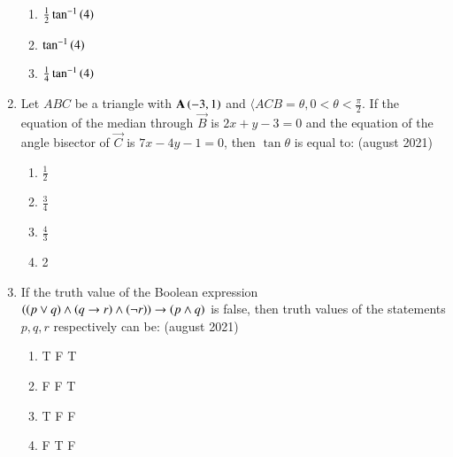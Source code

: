 \documentclass[journal,12pt,onecolumn]{IEEEtran}
\theoremstyle{remark}
\begin{document}
\begin{enumerate}
\begin{enumerate}
            \item $\frac{1}{2}\tan^{-1}\left(4\right)$
            \item $\tan^{-1}\left(4\right)$
            \item $\frac{1}{4}\tan^{-1}\left(4\right)$
        \end{enumerate}
        \item Let $ABC$ be a triangle with $\mathbf{A}\left(-3,1\right)$ and $\langle ACB=\theta,0<\theta<\frac{\pi}{2}$. If the equation of the median through $\vec{B}$ is $2x+y-3=0$ and the equation of the angle bisector of $\vec{C}$ is $7x-4y-1=0$, then $\tan \theta$ is equal to:
         \hfill{(august 2021)}  
		\begin{enumerate}
            \item $\frac{1}{2}$
            \item $\frac{3}{4}$
            \item $\frac{4}{3}$
            \item 2
        \end{enumerate}
        \item If the truth value of the Boolean expression $\left(\left(p \lor q\right) \land \left(q\rightarrow r\right) \land \left(\neg r\right)\right)\rightarrow \left(p \land q\right)$ is false, then truth values of the statements $p,q,r$ respectively can be:
         \hfill{(august 2021)}  
	\begin{enumerate}
            \item T F T
            \item F F T
            \item T F F
            \item F T F
        \end{enumerate}
        \end{enumerate}
\end{document}

